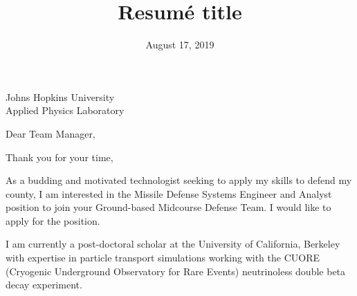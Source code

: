 \documentclass[11pt,letterpaper,sans]{moderncv}        %
\title{Resumé title}                               %
\begin{document}
{Johns Hopkins University\\Applied Physics Laboratory}
\date{August 17, 2019}
\opening{Dear Team Manager,}
\closing{Thank you for your time,}
\makelettertitle

As a budding and motivated technologist seeking to apply my skills to defend
my county, I am interested in the Missile Defense Systems Engineer and Analyst
position to join your Ground-based Midcourse Defense Team.
I would like to apply for the position.

I am currently a post-doctoral scholar at the University of California, Berkeley
with expertise in particle transport simulations working with the CUORE
(Cryogenic Underground Observatory for Rare Events) neutrinoless double beta decay experiment.


\end{document}
